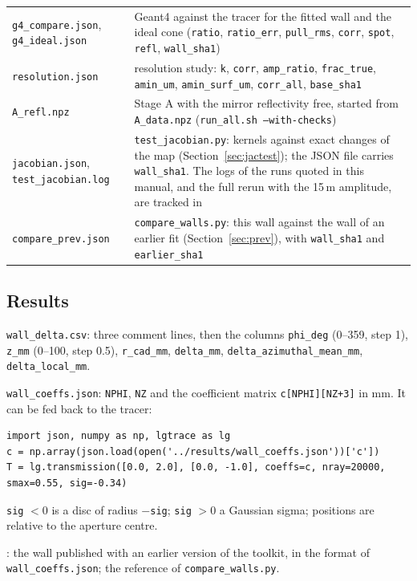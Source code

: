 \documentclass[11pt,a4paper]{article}
\newcommand{\um}{\,\textmu m}
\newcommand{\code}[1]{\texttt{#1}}
\begin{document}
\begin{tabularx}{\textwidth}{@{}L{3.5cm}Y@{}}
\code{g4\_compare.json}, \code{g4\_ideal.json} & Geant4 against the tracer for the fitted wall and
the ideal cone (\code{ratio}, \code{ratio\_err}, \code{pull\_rms}, \code{corr}, \code{spot},
\code{refl}, \code{wall\_sha1}) \\
\code{resolution.json} & resolution study: \code{k}, \code{corr}, \code{amp\_ratio},
\code{frac\_true}, \code{amin\_um}, \code{amin\_surf\_um}, \code{corr\_all}, \code{base\_sha1} \\
\code{A\_refl.npz} & Stage A with the mirror reflectivity free, started from \code{A\_data.npz}
(\code{run\_all.sh --with-checks}) \\
\code{jacobian.json}, \code{test\_jacobian.log} & \code{test\_jacobian.py}: kernels against exact
changes of the map (Section~\ref{sec:jactest}); the JSON file carries \code{wall\_sha1}. The logs of
the runs quoted in this manual, and the full rerun with the 15\um{} amplitude, are tracked in
 \\
\code{compare\_prev.json} & \code{compare\_walls.py}: this wall against the wall of an earlier fit
(Section~\ref{sec:prev}), with \code{wall\_sha1} and \code{earlier\_sha1} \\
\bottomrule
\end{tabularx}

\subsection{Results}

\code{wall\_delta.csv}: three comment lines, then the columns \code{phi\_deg} (0--359, step 1),
\code{z\_mm} (0--100, step 0.5), \code{r\_cad\_mm}, \code{delta\_mm}, \code{delta\_azimuthal\_mean\_mm},
\code{delta\_local\_mm}.

\code{wall\_coeffs.json}: \code{NPHI}, \code{NZ} and the coefficient matrix \code{c[NPHI][NZ+3]} in
mm. It can be fed back to the tracer:
\begin{lstlisting}
import json, numpy as np, lgtrace as lg
c = np.array(json.load(open('../results/wall_coeffs.json'))['c'])
T = lg.transmission([0.0, 2.0], [0.0, -1.0], coeffs=c, nray=20000, smax=0.55, sig=-0.34)
\end{lstlisting}
\code{sig} $<0$ is a disc of radius $-$\code{sig}; \code{sig} $>0$ a Gaussian sigma; positions are
relative to the aperture centre.

: the wall published with an earlier version of the
toolkit, in the format of \code{wall\_coeffs.json}; the reference of \code{compare\_walls.py}.
\end{document}
